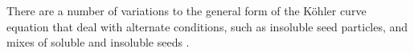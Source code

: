 
			There are a number of variations to the general form of the K\"{o}hler curve equation that deal with alternate conditions, such as insoluble seed particles, and mixes of soluble and insoluble seeds \citep[Chapter 17]{seinfeld2012atmospheric}.
